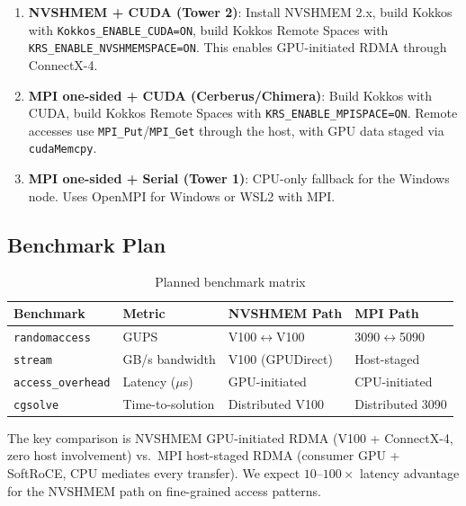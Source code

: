 \documentclass[11pt,letterpaper]{article}
\begin{document}
\begin{enumerate}[noitemsep]
    \item \textbf{NVSHMEM + CUDA (Tower 2)}: Install NVSHMEM 2.x, build Kokkos with \texttt{Kokkos\_ENABLE\_CUDA=ON}, build Kokkos Remote Spaces with \texttt{KRS\_ENABLE\_NVSHMEMSPACE=ON}. This enables GPU-initiated RDMA through ConnectX-4.

    \item \textbf{MPI one-sided + CUDA (Cerberus/Chimera)}: Build Kokkos with CUDA, build Kokkos Remote Spaces with \texttt{KRS\_ENABLE\_MPISPACE=ON}. Remote accesses use \texttt{MPI\_Put}/\texttt{MPI\_Get} through the host, with GPU data staged via \texttt{cudaMemcpy}.

    \item \textbf{MPI one-sided + Serial (Tower 1)}: CPU-only fallback for the Windows node. Uses OpenMPI for Windows or WSL2 with MPI.
\end{enumerate}

\subsection{Benchmark Plan}

\begin{table}[htbp]
\centering
\caption{Planned benchmark matrix}
\label{tab:benchmarks}
\begin{tabular}{@{}llll@{}}
\toprule
\textbf{Benchmark} & \textbf{Metric} & \textbf{NVSHMEM Path} & \textbf{MPI Path} \\
\midrule
\texttt{randomaccess} & GUPS & V100$\leftrightarrow$V100 & 3090$\leftrightarrow$5090 \\
\texttt{stream} & GB/s bandwidth & V100 (GPUDirect) & Host-staged \\
\texttt{access\_overhead} & Latency ($\mu$s) & GPU-initiated & CPU-initiated \\
\texttt{cgsolve} & Time-to-solution & Distributed V100 & Distributed 3090 \\
\bottomrule
\end{tabular}
\end{table}

The key comparison is NVSHMEM GPU-initiated RDMA (V100 + ConnectX-4, zero host involvement) vs.\ MPI host-staged RDMA (consumer GPU + SoftRoCE, CPU mediates every transfer). We expect $10\text{--}100\times$ latency advantage for the NVSHMEM path on fine-grained access patterns.

\end{document}
